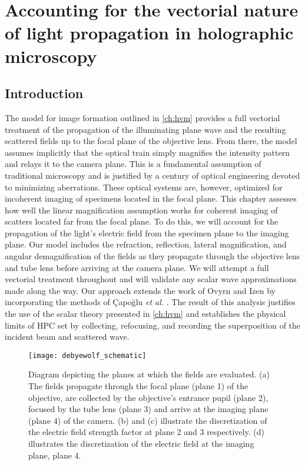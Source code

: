 \chapter{Accounting for the vectorial nature of light propagation in holographic microscopy}
\label{ch:debye}




\section{Introduction}

The model for image formation outlined in \autoref{ch:hvm} provides a full
vectorial treatment of the propagation of the illuminating plane wave and
the resulting scattered fields up to the focal plane of the objective lens.
From there, the model assumes implicitly that the optical train
simply magnifies the intensity pattern and relays it to the camera plane.
This is a fundamental assumption of traditional microscopy and is justified
by a century of optical engineering devoted to minimizing aberrations.
These optical systems are, however, optimized for incoherent imaging of
specimens located in the focal plane.
This chapter assesses how well the linear magnification assumption works for
coherent imaging of scatters located far from the focal plane. To do this, we will
account for the propagation of the light's electric field from
the specimen plane to the imaging plane. Our model includes the
refraction, reflection, lateral magnification, and angular demagnification
of the fields as they propagate through the objective lens and tube lens
before arriving at the camera plane. We will attempt a full vectorial
treatment throughout and will validate any scalar wave approximations
made along the way. Our approach extends the work of
Ovyrn and Izen\cite{izen00} by incorporating the methods of \c{C}apo\u{g}lu \emph{et al.}
\cite{capoglu12}. 
The result of this analysis justifies the use of the scalar theory presented in \autoref{ch:hvm} and
establishes the physical limits of HPC set by collecting, refocusing, and recording
the superposition of the incident beam and scattered wave.

\begin{figure}
  \centering
  \texttt{[image: debyewolf\_schematic]}
  \caption{Diagram depicting the planes at which the fields are evaluated.
    (a) The fields propagate through the focal plane (plane 1) of the objective,
    are collected by the objective's entrance pupil (plane 2), focused by the tube lens (plane 3)
    and arrive at the imaging plane (plane 4) of the camera. (b) and (c) illustrate the
    discretization of the electric field strength factor at plane 2 and 3 respectively.
    (d) illustrates the discretization of the electric field at the imaging plane, plane 4.}
  \label{fig:debye_schematic}
\end{figure}


